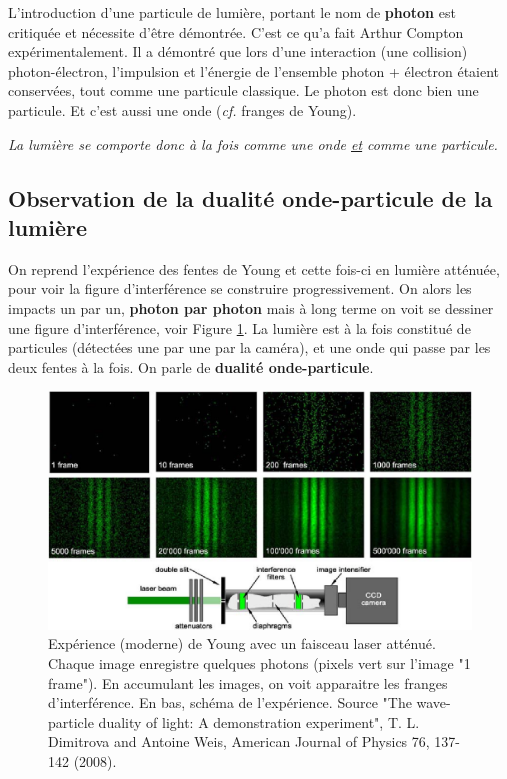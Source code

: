 \documentclass{book}
\begin{document}
L'introduction d'une particule de lumière, portant le nom de \textbf{photon} est critiquée et nécessite  d'être démontrée. C'est ce qu'a fait Arthur Compton expérimentalement. Il a démontré que lors d'une interaction (une collision) photon-électron, l'impulsion et l'énergie de l'ensemble photon + électron étaient conservées, tout comme une particule classique. Le photon est donc bien une particule. Et c'est aussi une onde (\textit{cf.} franges de Young). 
\begin{center}
\begin{large}
\textit{La lumière se comporte donc à la fois comme une onde \underline{et} comme une particule.}
\end{large}
\end{center}

\subsection{Observation de la dualité onde-particule de la lumière}
On reprend l'expérience des fentes de Young et cette fois-ci en lumière atténuée, pour voir la figure d'interférence se construire progressivement. On alors les impacts un par un, \textbf{photon par photon} mais à long terme on voit se dessiner une figure d'interférence, voir Figure \ref{TwoSlit}. La lumière est à la fois constitué de particules (détectées une par une par la caméra), et une onde qui passe par les deux fentes à la fois. On parle de {\bf dualité onde-particule}.

\begin{figure}
\includegraphics[width=1.0\linewidth]{images/TwoSlitPhoton_2}
\caption{Expérience (moderne) de Young avec un faisceau laser atténué. Chaque image enregistre quelques photons (pixels vert sur l'image "1 frame"). En accumulant les images, on voit apparaitre les franges d'interférence. En bas, schéma de l'expérience. Source "The wave-particle duality of light: A demonstration experiment",
  T. L. Dimitrova and Antoine Weis, American Journal of Physics 76, 137-142 (2008).
}
\label{TwoSlit}
\end{figure}
\end{document}

